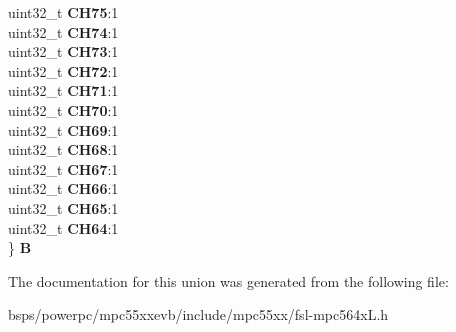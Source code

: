 \begin{DoxyCompactItemize}
\begin{tabbing}
\>uint32\_t {\bfseries CH75}:1\\
\>uint32\_t {\bfseries CH74}:1\\
\>uint32\_t {\bfseries CH73}:1\\
\>uint32\_t {\bfseries CH72}:1\\
\>uint32\_t {\bfseries CH71}:1\\
\>uint32\_t {\bfseries CH70}:1\\
\>uint32\_t {\bfseries CH69}:1\\
\>uint32\_t {\bfseries CH68}:1\\
\>uint32\_t {\bfseries CH67}:1\\
\>uint32\_t {\bfseries CH66}:1\\
\>uint32\_t {\bfseries CH65}:1\\
\>uint32\_t {\bfseries CH64}:1\\
\} {\bfseries B}\\

\end{tabbing}\end{DoxyCompactItemize}


The documentation for this union was generated from the following file\+:\begin{DoxyCompactItemize}
\item 
bsps/powerpc/mpc55xxevb/include/mpc55xx/fsl-\/mpc564x\+L.\+h\end{DoxyCompactItemize}
